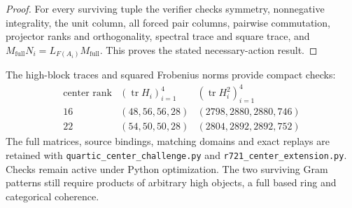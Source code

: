 \begin{proof}
For every surviving tuple the verifier checks symmetry, nonnegative
integrality, the unit column, all forced pair columns, pairwise
commutation, projector ranks and orthogonality, spectral trace and
square trace, and
$M_{\mathrm{full}}N_i=L_{F(A_i)}M_{\mathrm{full}}$.
This proves the stated necessary-action result.
\end{proof}

The high-block traces and squared Frobenius norms provide compact checks:
\[
\begin{array}{c|c|c}
\text{center rank}&(\operatorname{tr}H_i)_{i=1}^4&
 (\operatorname{tr}H_i^2)_{i=1}^4\\\hline
16&(48,56,56,28)&(2798,2880,2880,746)\\
22&(54,50,50,28)&(2804,2892,2892,752)
\end{array}
\]
The full matrices, source bindings, matching domains and exact replays are
retained with \texttt{quartic\_center\_challenge.py} and
\texttt{r721\_center\_extension.py}.  Checks remain active under Python
optimization.  The two surviving Gram patterns still require products
of arbitrary high objects, a full based ring and categorical coherence.
